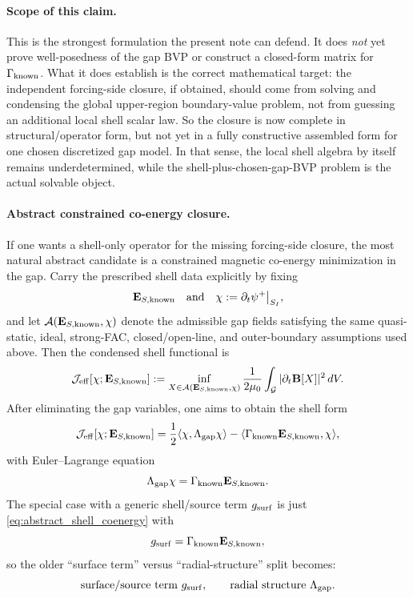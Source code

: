 \documentclass[11pt,a4paper]{article}
\begin{document}
\paragraph{Scope of this claim.}
This is the strongest formulation the present note can defend. It does
\emph{not} yet prove well-posedness of the gap BVP or construct a closed-form
matrix for \(\Gamma_{\rm known}\). What it does establish is the correct
mathematical target: the independent forcing-side closure, if obtained, should
come from solving and condensing the global upper-region boundary-value
problem, not from guessing an additional local shell scalar law. So the
closure is now complete in structural/operator form, but not yet in a fully
constructive assembled form for one chosen discretized gap model. In that
sense, the local shell algebra by itself remains underdetermined, while the
shell-plus-chosen-gap-BVP problem is the actual solvable object.

\paragraph{Abstract constrained co-energy closure.}
If one wants a shell-only operator for the missing forcing-side closure, the
most natural abstract candidate is a constrained magnetic co-energy
minimization in the gap. Carry the prescribed shell data explicitly by fixing
\[
\mathbf E_{S,\rm known}
\quad\text{and}\quad
\chi:=\partial_t\psi^+\big|_{S_I},
\]
and let \(\mathcal A(\mathbf E_{S,\rm known},\chi)\) denote the admissible gap
fields satisfying the same quasi-static, ideal, strong-FAC, closed/open-line,
and outer-boundary assumptions used above. Then the condensed shell functional
is
\begin{equation}
\mathcal J_{\rm eff}[\chi;\mathbf E_{S,\rm known}]
:=
\inf_{X\in\mathcal A(\mathbf E_{S,\rm known},\chi)}
\frac{1}{2\mu_0}\int_{\mathcal G} |\partial_t\mathbf B[X]|^2\,dV.
\label{eq:abstract_gap_coenergy_functional}
\end{equation}
After eliminating the gap variables, one aims to obtain the shell form
\begin{equation}
\mathcal J_{\rm eff}[\chi;\mathbf E_{S,\rm known}]
=
\frac12 \langle \chi,\Lambda_{\rm gap}\chi\rangle
- \langle \Gamma_{\rm known}\mathbf E_{S,\rm known}, \chi\rangle,
\label{eq:abstract_shell_coenergy}
\end{equation}
with Euler--Lagrange equation
\begin{equation}
\Lambda_{\rm gap}\chi = \Gamma_{\rm known}\mathbf E_{S,\rm known}.
\label{eq:abstract_shell_coenergy_EL}
\end{equation}
The special case with a generic shell/source term \(g_{\rm surf}\) is just
\eqref{eq:abstract_shell_coenergy} with
\[
g_{\rm surf}=\Gamma_{\rm known}\mathbf E_{S,\rm known},
\]
so the older ``surface term'' versus ``radial-structure'' split becomes:
\[
\text{surface/source term } g_{\rm surf},
\qquad
\text{radial structure } \Lambda_{\rm gap}.
\]
\end{document}
